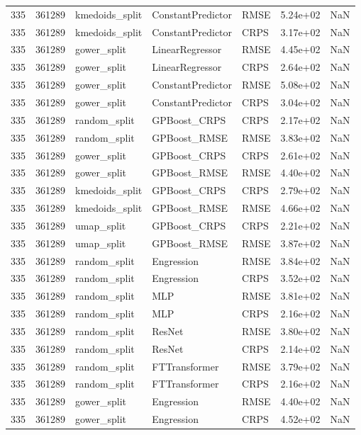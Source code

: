 \begin{tabular}{rrlllrr}
335 & 361289 & kmedoids\_split & ConstantPredictor & RMSE & 5.24e+02 & NaN \\
335 & 361289 & kmedoids\_split & ConstantPredictor & CRPS & 3.17e+02 & NaN \\
335 & 361289 & gower\_split & LinearRegressor & RMSE & 4.45e+02 & NaN \\
335 & 361289 & gower\_split & LinearRegressor & CRPS & 2.64e+02 & NaN \\
335 & 361289 & gower\_split & ConstantPredictor & RMSE & 5.08e+02 & NaN \\
335 & 361289 & gower\_split & ConstantPredictor & CRPS & 3.04e+02 & NaN \\
335 & 361289 & random\_split & GPBoost\_CRPS & CRPS & 2.17e+02 & NaN \\
335 & 361289 & random\_split & GPBoost\_RMSE & RMSE & 3.83e+02 & NaN \\
335 & 361289 & gower\_split & GPBoost\_CRPS & CRPS & 2.61e+02 & NaN \\
335 & 361289 & gower\_split & GPBoost\_RMSE & RMSE & 4.40e+02 & NaN \\
335 & 361289 & kmedoids\_split & GPBoost\_CRPS & CRPS & 2.79e+02 & NaN \\
335 & 361289 & kmedoids\_split & GPBoost\_RMSE & RMSE & 4.66e+02 & NaN \\
335 & 361289 & umap\_split & GPBoost\_CRPS & CRPS & 2.21e+02 & NaN \\
335 & 361289 & umap\_split & GPBoost\_RMSE & RMSE & 3.87e+02 & NaN \\
335 & 361289 & random\_split & Engression & RMSE & 3.84e+02 & NaN \\
335 & 361289 & random\_split & Engression & CRPS & 3.52e+02 & NaN \\
335 & 361289 & random\_split & MLP & RMSE & 3.81e+02 & NaN \\
335 & 361289 & random\_split & MLP & CRPS & 2.16e+02 & NaN \\
335 & 361289 & random\_split & ResNet & RMSE & 3.80e+02 & NaN \\
335 & 361289 & random\_split & ResNet & CRPS & 2.14e+02 & NaN \\
335 & 361289 & random\_split & FTTransformer & RMSE & 3.79e+02 & NaN \\
335 & 361289 & random\_split & FTTransformer & CRPS & 2.16e+02 & NaN \\
335 & 361289 & gower\_split & Engression & RMSE & 4.40e+02 & NaN \\
335 & 361289 & gower\_split & Engression & CRPS & 4.52e+02 & NaN \\

\end{tabular}
